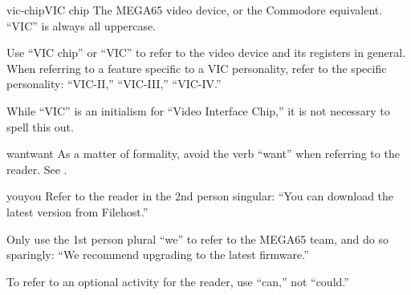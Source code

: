 \begin{sgentry}{vic-chip}{VIC chip}
    The MEGA65 video device, or the Commodore equivalent. ``VIC'' is always all uppercase.

    Use ``VIC chip'' or ``VIC'' to refer to the video device and its registers in general. When referring to a feature specific to a VIC personality, refer to the specific personality: ``VIC-II,'' ``VIC-III,'' ``VIC-IV.''

    While ``VIC'' is an initialism for ``Video Interface Chip,'' it is not necessary to spell this out.
\end{sgentry}

\begin{sgentry}{want}{want}
    As a matter of formality, avoid the verb ``want'' when referring to the reader. See .
\end{sgentry}

\begin{sgentry}{you}{you}
    Refer to the reader in the 2nd person singular: ``You can download the latest version from Filehost.''

    Only use the 1st person plural ``we'' to refer to the MEGA65 team, and do so sparingly: ``We recommend upgrading to the latest firmware.''

    To refer to an optional activity for the reader, use ``can,'' not ``could.''
\end{sgentry}



